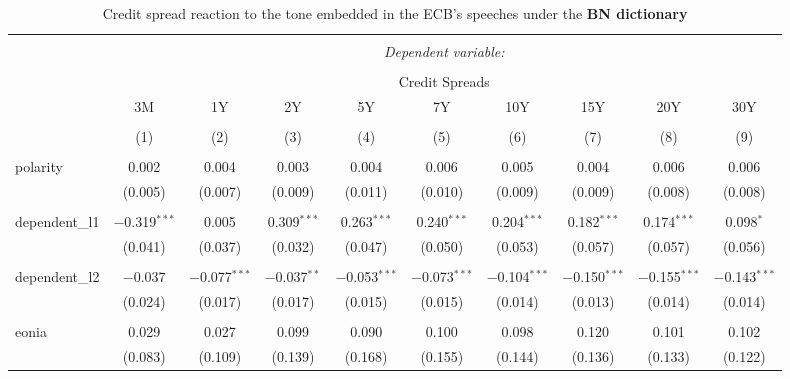 

\begin{table}[!htbp] \centering 
  \caption[BN Tone \& Credit Spread: all speeches]{
  Credit spread reaction to the tone embedded in the ECB's speeches under the \textbf{BN dictionary}} 
  \label{tab:spreads_all_bn} 
  \begin{adjustbox}{width=1.25\textwidth}
\begin{tabular}{@{\extracolsep{5pt}}lccccccccc} 
\\[-1.8ex]\hline 
\hline \\[-1.8ex] 
 & \multicolumn{9}{c}{\textit{Dependent variable:}} \\ 
\cline{2-10} 
\\[-1.8ex] & \multicolumn{9}{c}{Credit Spreads} \\ 
 & 3M & 1Y & 2Y & 5Y & 7Y & 10Y & 15Y & 20Y & 30Y \\ 
\\[-1.8ex] & (1) & (2) & (3) & (4) & (5) & (6) & (7) & (8) & (9)\\ 
\hline \\[-1.8ex] 
 polarity & 0.002 & 0.004 & 0.003 & 0.004 & 0.006 & 0.005 & 0.004 & 0.006 & 0.006 \\ 
  & (0.005) & (0.007) & (0.009) & (0.011) & (0.010) & (0.009) & (0.009) & (0.008) & (0.008) \\ 
  & & & & & & & & & \\ 
 dependent\_l1 & $-$0.319$^{***}$ & 0.005 & 0.309$^{***}$ & 0.263$^{***}$ & 0.240$^{***}$ & 0.204$^{***}$ & 0.182$^{***}$ & 0.174$^{***}$ & 0.098$^{*}$ \\ 
  & (0.041) & (0.037) & (0.032) & (0.047) & (0.050) & (0.053) & (0.057) & (0.057) & (0.056) \\ 
  & & & & & & & & & \\ 
 dependent\_l2 & $-$0.037 & $-$0.077$^{***}$ & $-$0.037$^{**}$ & $-$0.053$^{***}$ & $-$0.073$^{***}$ & $-$0.104$^{***}$ & $-$0.150$^{***}$ & $-$0.155$^{***}$ & $-$0.143$^{***}$ \\ 
  & (0.024) & (0.017) & (0.017) & (0.015) & (0.015) & (0.014) & (0.013) & (0.014) & (0.014) \\ 
  & & & & & & & & & \\ 
 eonia & 0.029 & 0.027 & 0.099 & 0.090 & 0.100 & 0.098 & 0.120 & 0.101 & 0.102 \\ 
  & (0.083) & (0.109) & (0.139) & (0.168) & (0.155) & (0.144) & (0.136) & (0.133) & (0.122) \\ 

\end{tabular}
\end{adjustbox}
\end{table}
